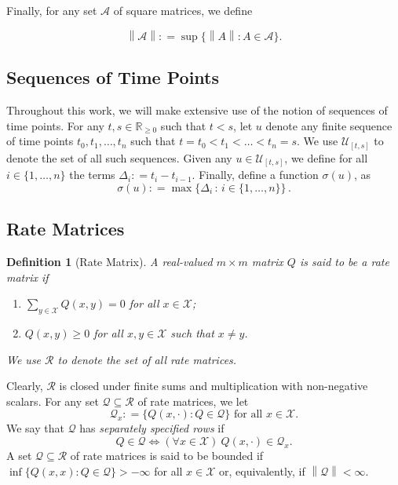 \documentclass[10pt]{paper}
\newtheorem{definition}{Definition}
\newcommand{\reals}{\mathbb{R}}
\newcommand{\realsnonneg}{\reals_{\geq 0}}
\newcommand{\states}{\mathcal{X}}
\newcommand{\rateset}{\mathcal{Q}}
\newcommand{\asa}{\Leftrightarrow}
\newcommand{\norm}[1]{\left\lVert #1 \right\rVert}
\newcommand{\coloneqq}{:\!=}
\begin{document}
\noindent
Finally, for any set $\mathcal{A}$ of square matrices, we define

\begin{equation*}
\norm{\mathcal{A}}\coloneqq\sup\{\norm{A}\colon A\in\mathcal{A}\}.
\end{equation*}

\subsection{Sequences of Time Points}

Throughout this work, we will make extensive use of the notion of sequences of time points. For any $t,s\in\realsnonneg$ such that $t<s$, let $u$ denote any finite sequence of time points $t_0,t_1,\ldots,t_n$ such that $t=t_0 < t_1 <\ldots < t_n = s$. We use $\mathcal{U}_{[t,s]}$ to denote the set of all such sequences. Given any $u\in\mathcal{U}_{[t,s]}$, we define for all $i\in\{1,\ldots,n\}$ the terms $\Delta_i\coloneqq t_i-t_{i-1}$.  Finally, define a function $\sigma(u)$, as
\begin{equation*}
\sigma(u) \coloneqq \max\bigl\{\Delta_i\,:\,i\in\{1,\ldots,n\}\bigr\}\,.
\end{equation*}

\subsection{Rate Matrices}

\begin{definition}[Rate Matrix]\label{def:rate_matrix}
A real-valued $m\times m$ matrix $Q$ is said to be a \emph{rate matrix} if

\vspace{5pt}
\begin{enumerate}[label=R\arabic*:]
\item
$\sum_{y\in\states}Q(x,y)=0$ for all $x\in\states$;
\item
$Q(x,y)\geq0$ for all $x,y\in\states$ such that $x\neq y$.
\end{enumerate}
\vspace{5pt}
\noindent
We use $\mathcal{R}$ to denote the set of all rate matrices. 
\end{definition}

Clearly, $\mathcal{R}$ is closed under finite sums and multiplication with non-negative scalars. For any set $\rateset\subseteq\mathcal{R}$ of rate matrices, we let
\begin{equation*}
\rateset_x\coloneqq\{Q(x,\cdot)\colon Q\in\rateset\}
\text{ for all $x\in\states$.}
\end{equation*}
We say that $\rateset$ has \emph{separately specified rows} if
\begin{equation*}
Q\in\rateset\asa(\forall x\in\states)~Q(x,\cdot)\in\rateset_x.
\end{equation*}
A set $\rateset\subseteq\mathcal{R}$ of rate matrices is said to be bounded if $\inf\{Q(x,x)\colon Q\in\rateset\}>-\infty$ for all $x\in\states$ or, equivalently, if $\norm{\rateset}<\infty$. 
\end{document}
